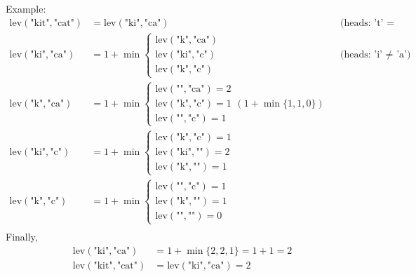 \documentclass{article}
\begin{document}
Example:
\begin{align*}
\text{lev}(\text{"kit"}, \text{"cat"}) 
    &= \text{lev}(\text{"ki"}, \text{"ca"}) && \text{(heads: 't' = 't')} \\[1em]
\text{lev}(\text{"ki"}, \text{"ca"})
    &= 1 + \min \left\{
        \begin{array}{l}
            \text{lev}(\text{"k"}, \text{"ca"}) \\
            \text{lev}(\text{"ki"}, \text{"c"}) \\
            \text{lev}(\text{"k"}, \text{"c"})
        \end{array}
    \right. && \text{(heads: 'i' $\neq$ 'a')} \\[1em]
\text{lev}(\text{"k"}, \text{"ca"})
    &= 1 + \min \left\{
        \begin{array}{l}
            \text{lev}(\text{""}, \text{"ca"}) = 2 \\
            \text{lev}(\text{"k"}, \text{"c"}) = 1 \\
            \text{lev}(\text{""}, \text{"c"}) = 1
        \end{array}
    \right. (1 + \min\{1,1,0\}) \\[1em]
\text{lev}(\text{"ki"}, \text{"c"})
    &= 1 + \min \left\{
        \begin{array}{l}
            \text{lev}(\text{"k"}, \text{"c"}) = 1 \\
            \text{lev}(\text{"ki"}, \text{""}) = 2 \\
            \text{lev}(\text{"k"}, \text{""}) = 1
        \end{array}
    \right. \\[1em]
\text{lev}(\text{"k"}, \text{"c"})
    &= 1 + \min \left\{
        \begin{array}{l}
            \text{lev}(\text{""}, \text{"c"}) = 1 \\
            \text{lev}(\text{"k"}, \text{""}) = 1 \\
            \text{lev}(\text{""}, \text{""}) = 0
        \end{array}
    \right. \\[1em]
\end{align*}
Finally,
\begin{align*}
\text{lev}(\text{"ki"}, \text{"ca"})
    &= 1 + \min\{2,2,1\} = 1 + 1 = 2 \\[1em]
\text{lev}(\text{"kit"}, \text{"cat"})
    &= \text{lev}(\text{"ki"}, \text{"ca"}) = 2
\end{align*}
\end{document}
